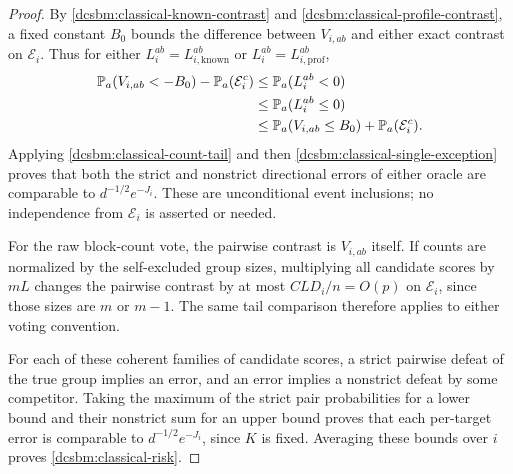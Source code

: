 \begin{proof}
By \eqref{dcsbm:classical-known-contrast} and
\eqref{dcsbm:classical-profile-contrast}, a fixed constant \(B_0\)
bounds the difference between \(V_{i,ab}\) and either exact contrast
on \(\mathcal E_i\). Thus for either
\(L^{ab}_i=L^{ab}_{i,\mathrm{known}}\) or
\(L^{ab}_i=L^{ab}_{i,\mathrm{prof}}\),
\begin{align*}
 \mathbb P_a(V_{i,ab}<-B_0)-\mathbb P_a(\mathcal E_i^c)
 &\le \mathbb P_a(L^{ab}_i<0)\\
 &\le \mathbb P_a(L^{ab}_i\le0)\\
 &\le \mathbb P_a(V_{i,ab}\le B_0)+\mathbb P_a(\mathcal E_i^c).
\end{align*}
Applying \eqref{dcsbm:classical-count-tail} and then
\eqref{dcsbm:classical-single-exception} proves that both the strict
and nonstrict directional errors of either oracle are comparable
to \(d^{-1/2}e^{-J_i}\).
These are unconditional event inclusions; no independence from
\(\mathcal E_i\) is asserted or needed.

For the raw block-count vote, the pairwise contrast is \(V_{i,ab}\)
itself. If counts are normalized by the self-excluded group sizes,
multiplying all candidate scores by \(mL\) changes the pairwise
contrast by at most \(CLD_i/n=O(p)\) on \(\mathcal E_i\), since
those sizes are \(m\) or \(m-1\). The same tail comparison therefore
applies to either voting convention.

For each of these coherent families of candidate scores, a strict
pairwise defeat of the true group implies an error, and an error
implies a nonstrict defeat by some competitor. Taking the maximum
of the strict pair probabilities for a lower bound and their
nonstrict sum for an upper bound proves that each per-target error
is comparable to \(d^{-1/2}e^{-J_i}\), since \(K\) is fixed.
Averaging these bounds over \(i\) proves
\eqref{dcsbm:classical-risk}.
\end{proof}

